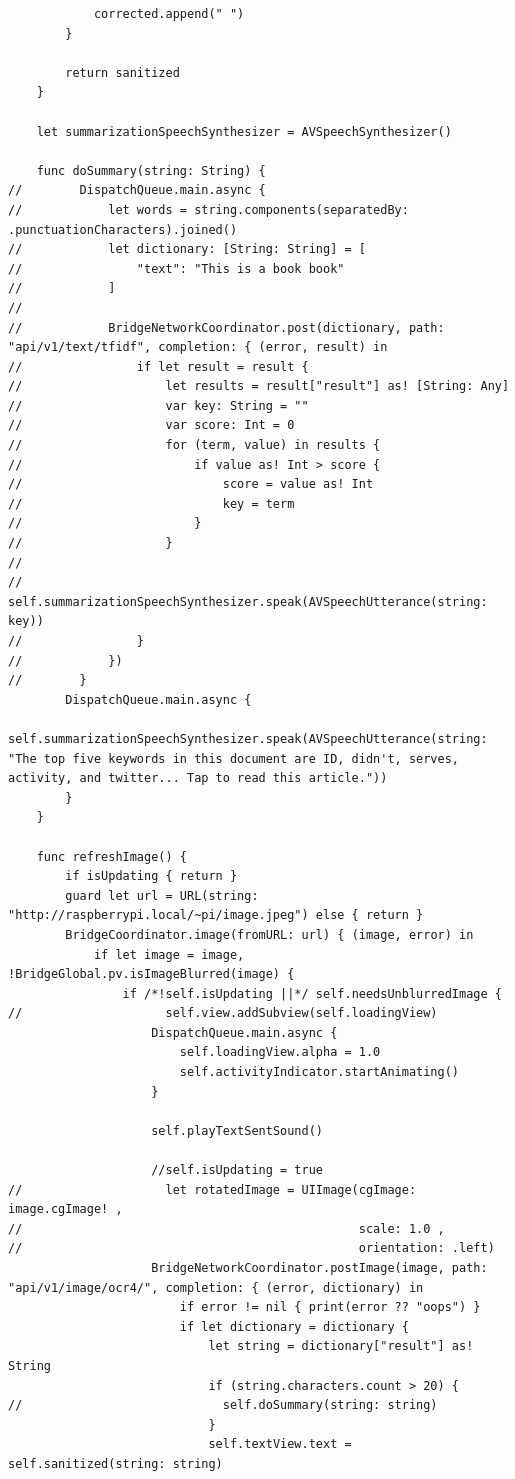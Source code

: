 \begin{lstlisting}
            corrected.append(" ")
        }
        
        return sanitized
    }
    
    let summarizationSpeechSynthesizer = AVSpeechSynthesizer()
    
    func doSummary(string: String) {
//        DispatchQueue.main.async {
//            let words = string.components(separatedBy: .punctuationCharacters).joined()
//            let dictionary: [String: String] = [
//                "text": "This is a book book"
//            ]
//            
//            BridgeNetworkCoordinator.post(dictionary, path: "api/v1/text/tfidf", completion: { (error, result) in
//                if let result = result {
//                    let results = result["result"] as! [String: Any]
//                    var key: String = ""
//                    var score: Int = 0
//                    for (term, value) in results {
//                        if value as! Int > score {
//                            score = value as! Int
//                            key = term
//                        }
//                    }
//                    
//                    self.summarizationSpeechSynthesizer.speak(AVSpeechUtterance(string: key))
//                }
//            })
//        }
        DispatchQueue.main.async {
        self.summarizationSpeechSynthesizer.speak(AVSpeechUtterance(string: "The top five keywords in this document are ID, didn't, serves, activity, and twitter... Tap to read this article."))
        }
    }
    
    func refreshImage() {
        if isUpdating { return }
        guard let url = URL(string: "http://raspberrypi.local/~pi/image.jpeg") else { return }
        BridgeCoordinator.image(fromURL: url) { (image, error) in
            if let image = image, !BridgeGlobal.pv.isImageBlurred(image) {
                if /*!self.isUpdating ||*/ self.needsUnblurredImage {
//                    self.view.addSubview(self.loadingView)
                    DispatchQueue.main.async {
                        self.loadingView.alpha = 1.0
                        self.activityIndicator.startAnimating()
                    }
                    
                    self.playTextSentSound()
                    
                    //self.isUpdating = true
//                    let rotatedImage = UIImage(cgImage: image.cgImage! ,
//                                               scale: 1.0 ,
//                                               orientation: .left)
                    BridgeNetworkCoordinator.postImage(image, path: "api/v1/image/ocr4/", completion: { (error, dictionary) in
                        if error != nil { print(error ?? "oops") }
                        if let dictionary = dictionary {
                            let string = dictionary["result"] as! String
                            if (string.characters.count > 20) {
//                            self.doSummary(string: string)
                            }
                            self.textView.text = self.sanitized(string: string)
                            

\end{lstlisting}
